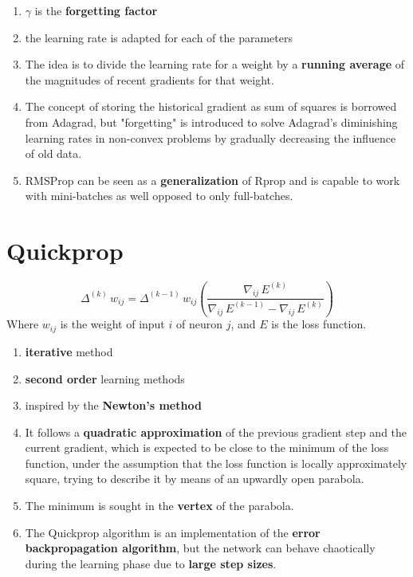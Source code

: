 \begin{enumerate}
    \item ${\displaystyle \gamma}$ is the \textbf{forgetting factor}

    \item the learning rate is adapted for each of the parameters

    \item The idea is to divide the learning rate for a weight by a \textbf{running average} of the magnitudes of recent gradients for that weight.

    \item The concept of storing the historical gradient as sum of squares is borrowed from Adagrad, but "forgetting" is introduced to solve Adagrad's diminishing learning rates in non-convex problems by gradually decreasing the influence of old data.

    \item RMSProp can be seen as a \textbf{generalization} of Rprop and is capable to work with mini-batches as well opposed to only full-batches.
\end{enumerate}



\section{Quickprop \cite{wiki-Quickprop}}\label{Quickprop}

\[
    {\displaystyle \Delta ^{(k)}\,w_{ij}=\Delta ^{(k-1)}\,w_{ij}\left({\frac {\nabla _{ij}\,E^{(k)}}{\nabla _{ij}\,E^{(k-1)}-\nabla _{ij}\,E^{(k)}}}\right)}
\]
Where ${\displaystyle w_{ij}}$ is the weight of input ${\displaystyle i}$ of neuron ${\displaystyle j}$, and ${\displaystyle E}$ is the loss function.

\begin{enumerate}
    \item \textbf{iterative} method
    
    \item \textbf{second order} learning methods
    
    \item inspired by the \textbf{Newton's method}
    
    \item It follows a \textbf{quadratic approximation} of the previous gradient step and the current gradient, which is expected to be close to the minimum of the loss function, under the assumption that the loss function is locally approximately square, trying to describe it by means of an upwardly open parabola. 
    
    \item The minimum is sought in the \textbf{vertex} of the parabola.

    \item The Quickprop algorithm is an implementation of the \textbf{error backpropagation algorithm}, but the network can behave chaotically during the learning phase due to \textbf{large step sizes}.
\end{enumerate}



